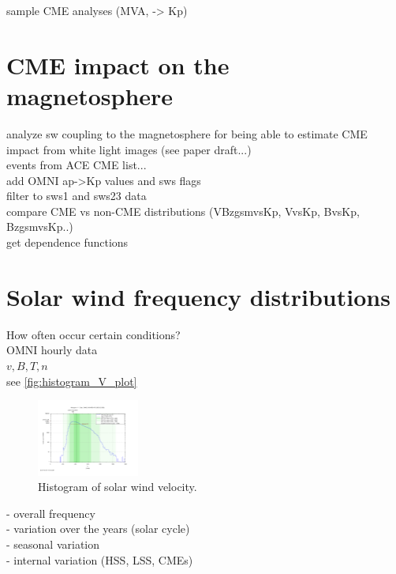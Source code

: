sample CME analyses (MVA, -> Kp)\\


\section{CME impact on the magnetosphere}

analyze sw coupling to the magnetosphere for being able to estimate CME impact from white light images (see paper draft...)\\

events from ACE CME list...\\

add OMNI ap->Kp values and sws flags\\
filter to sws1 and sws23 data\\
compare CME vs non-CME distributions (VBzgsmvsKp, VvsKp, BvsKp, BzgsmvsKp..)\\
get dependence functions\\


\section{Solar wind frequency distributions}

How often occur certain conditions?\\

OMNI hourly data\\
$v, B, T, n$\\
see \autoref{fig:histogram_V_plot}
\begin{figure}[htb]
	\centering
	\includegraphics[width=0.3\textwidth]{images/gnuplots/histogram_V_plot.png}
	\caption{Histogram of solar wind velocity.}
	\label{fig:histogram_V_plot}
\end{figure}


- overall frequency\\
- variation over the years (solar cycle)\\
- seasonal variation\\
- internal variation (HSS, LSS, CMEs)\\


